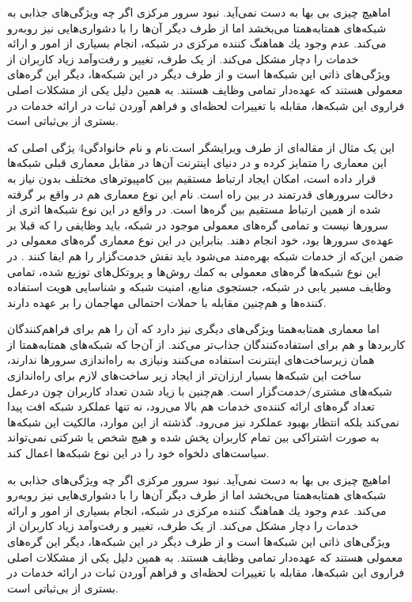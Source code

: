 \documentclass[12pt,twoside]{xepersian-magazine}
\begin{document}
\begin{article}{2}
اماهيچ چيزی بی‌ بها به دست نمی‌آید. نبود سرور مرکزی اگر چه  ويژگی‌های جذابی به شبکه‌های همتابه‌همتا می‌بخشد اما از طرف ديگر آن‌ها را با دشواری‌هايی نيز روبه‌رو می‌کند.  عدم وجود يك هماهنگ كننده مركزی در شبكه، انجام بسياری از امور و ارائه خدمات را  دچار مشكل می‌کند.  از يک طرف، تغيير و رفت‌وآمد زیاد کاربران از ويژگی‌های ذاتی اين شبکه‌ها است و از طرف ديگر در اين شبكه‌ها، ديگر اين گره‌های معمولی  هستند كه  عهده‌دار تمامی وظايف هستند. به همين دلیل يکی از مشکلات اصلی فراروی اين شبكه‌ها، مقابله با  تغييرات لحظه‌ای و فراهم آوردن ثبات در ارائه  خدمات در بستری از بی‌ثباتی است.
\end{article}

\articlesep

\begin{editorial}{1}{این یک مثال از مقاله‌ای از طرف ویرایشگر است.}{نام و نام خانوادگی}{4}
يژگی اصلی که اين معماری را متمايز کرده و در دنيای اينترنت آن‌ها در مقابل معماری قبلی شبكه‌ها قرار داده است، امكان ايجاد ارتباط مستقيم  بين كامپيوترهای مختلف بدون نياز به دخالت سرورهای قدرتمند در بين راه است.  نام‌ اين نوع معماری هم در واقع بر گرفته شده از همین  ارتباط مستقیم بين گره‌ها است.  در واقع در اين نوع شبكه‌ها اثری از سرورها نيست و تمامی گره‌های معمولی موجود در شبكه، بايد وظايفی را که قبلا بر عهده‌ی سرورها بود، خود انجام دهند. بنابراين در اين نوع معماری گره‌های معمولی در ضمن اين‌که از خدمات شبکه بهره‌مند می‌شود بايد نقش خدمت‌گزار را هم ايفا کنند . در اين نوع شبکه‌ها گره‌های معمولی به كمك روش‌ها و پروتكل‌های توزيع شده، تمامی وظايف  مسير يابی در شبكه، جستجوی منابع، امنيت شبكه و شناسايی هويت استفاده كننده‌ها و هم‌چنين مقابله با حملات احتمالی مهاجمان را بر عهده دارند.

اما معماری همتابه‌همتا ويژگی‌های ديگری نيز دارد که آن را هم برای فراهم‌کنندگان کاربردها و هم برای استفاده‌کنندگان جذاب‌تر می‌کند.  از آن‌جا که شبکه‌های همتابه‌همتا از همان زيرساخت‌های اينترنت استفاده می‌کنند ونيازی به راه‌اندازی سرورها ندارند، ساخت اين شبكه‌ها بسيار ارزان‌تر از ايجاد زير ساخت‌های لازم برای راه‌اندازی شبكه‌های مشتری/خدمت‌گزار است.  هم‌چنين با زياد شدن تعداد کاربران چون درعمل تعداد گره‌های ارائه کننده‌ی خدمات هم بالا می‌رود، نه تنها عملكرد شبكه افت پيدا نمی‌كند بلكه انتظار بهبود عملکرد نيز می‌رود. گذشته از اين موارد، مالكيت اين شبكه‌ها به صورت اشتراكی بين تمام کاربران پخش شده و هيچ شخص يا شركتی نمی‌تواند سياست‌های دلخواه خود را در اين نوع شبكه‌ها اعمال کند.

اماهيچ چيزی بی‌ بها به دست نمی‌آید. نبود سرور مرکزی اگر چه  ويژگی‌های جذابی به شبکه‌های همتابه‌همتا می‌بخشد اما از طرف ديگر آن‌ها را با دشواری‌هايی نيز روبه‌رو می‌کند.  عدم وجود يك هماهنگ كننده مركزی در شبكه، انجام بسياری از امور و ارائه خدمات را  دچار مشكل می‌کند.  از يک طرف، تغيير و رفت‌وآمد زیاد کاربران از ويژگی‌های ذاتی اين شبکه‌ها است و از طرف ديگر در اين شبكه‌ها، ديگر اين گره‌های معمولی  هستند كه  عهده‌دار تمامی وظايف هستند. به همين دلیل يکی از مشکلات اصلی فراروی اين شبكه‌ها، مقابله با  تغييرات لحظه‌ای و فراهم آوردن ثبات در ارائه  خدمات در بستری از بی‌ثباتی است.
\end{editorial}
\end{document}
